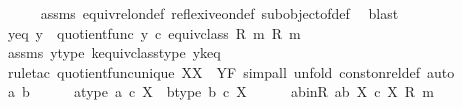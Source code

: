 \begin{isabellebody}
\ \ \ \ \isamarkupfalse%
\ assms\ equiv{\isacharunderscore}{\kern0pt}rel{\isacharunderscore}{\kern0pt}on{\isacharunderscore}{\kern0pt}def\ reflexive{\isacharunderscore}{\kern0pt}on{\isacharunderscore}{\kern0pt}def\ subobject{\isacharunderscore}{\kern0pt}of{\isacharunderscore}{\kern0pt}def{}\ \isamarkupfalse%
\ blast\isanewline
\isanewline
\ \ \isamarkupfalse%
\ y{\isacharunderscore}{\kern0pt}eq{\isacharcolon}{\kern0pt}\ {\isachardoublequoteopen}y\ {\isacharequal}{\kern0pt}\ quotient{\isacharunderscore}{\kern0pt}func\ {\isacharparenleft}{\kern0pt}y\ {\isasymcirc}\isactrlsub c\ equiv{\isacharunderscore}{\kern0pt}class\ {\isacharparenleft}{\kern0pt}R{\isacharcomma}{\kern0pt}\ m{\isacharparenright}{\kern0pt}{\isacharparenright}{\kern0pt}\ {\isacharparenleft}{\kern0pt}R{\isacharcomma}{\kern0pt}\ m{\isacharparenright}{\kern0pt}{\isachardoublequoteclose}\isanewline
\ \ \ \ \isamarkupfalse%
\ assms\ y{\isacharunderscore}{\kern0pt}type\ k{\isacharunderscore}{\kern0pt}equiv{\isacharunderscore}{\kern0pt}class{\isacharunderscore}{\kern0pt}type\ y{\isacharunderscore}{\kern0pt}k{\isacharunderscore}{\kern0pt}eq\isanewline
\ \ \isamarkupfalse%
\ {\isacharparenleft}{\kern0pt}rule{\isacharunderscore}{\kern0pt}tac\ quotient{\isacharunderscore}{\kern0pt}func{\isacharunderscore}{\kern0pt}unique{\isacharbrackleft}{\kern0pt}\ X{\isacharequal}{\kern0pt}X{\isacharcomma}{\kern0pt}\ \ Y{\isacharequal}{\kern0pt}F{\isacharbrackright}{\kern0pt}{\isacharcomma}{\kern0pt}\ simp{\isacharunderscore}{\kern0pt}all{\isacharcomma}{\kern0pt}\ unfold\ const{\isacharunderscore}{\kern0pt}on{\isacharunderscore}{\kern0pt}rel{\isacharunderscore}{\kern0pt}def{\isacharcomma}{\kern0pt}\ auto{\isacharparenright}{\kern0pt}\isanewline
\ \ \ \ \isamarkupfalse%
\ a\ b\isanewline
\ \ \ \ \isamarkupfalse%
\ a{\isacharunderscore}{\kern0pt}type{\isacharcolon}{\kern0pt}\ {\isachardoublequoteopen}a\ {\isasymin}\isactrlsub c\ X{\isachardoublequoteclose}\ \ b{\isacharunderscore}{\kern0pt}type{\isacharcolon}{\kern0pt}\ {\isachardoublequoteopen}b\ {\isasymin}\isactrlsub c\ X{\isachardoublequoteclose}\isanewline
\ \ \ \ \isamarkupfalse%
\ ab{\isacharunderscore}{\kern0pt}in{\isacharunderscore}{\kern0pt}R{\isacharcolon}{\kern0pt}\ {\isachardoublequoteopen}{\isasymlangle}a{\isacharcomma}{\kern0pt}b{\isasymrangle}\ {\isasymin}\isactrlbsub X\ {\isasymtimes}\isactrlsub c\ X\isactrlesub \ {\isacharparenleft}{\kern0pt}R{\isacharcomma}{\kern0pt}\ m{\isacharparenright}{\kern0pt}{\isachardoublequoteclose}\isanewline

\end{isabellebody}
